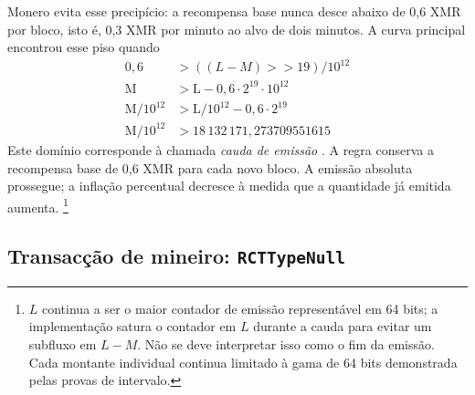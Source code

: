 Monero  evita esse precipício: a recompensa base nunca
desce abaixo de 0,6 XMR por bloco, isto é, 0,3 XMR por minuto ao alvo de dois
minutos. A curva principal encontrou esse piso quando
\begin{align*}
               0{,}6 &> ((L-M)\mathbin{>>}19)/10^{12} \\
        \textrm{M} &> \textrm{L} - 0{,}6\cdot2^{19}\cdot10^{12} \\
\textrm{M}/10^{12} &> \textrm{L}/10^{12} - 0{,}6\cdot2^{19} \\
\textrm{M}/10^{12} &> 18\,132\,171{,}273709551615
\end{align*}
%
Este domínio corresponde à chamada \emph{cauda de emissão}
\cite{monero-tail-emission}. A regra conserva a recompensa base de 0,6
XMR para cada novo bloco. A emissão absoluta prossegue; a inflação percentual
decresce à medida que a quantidade já emitida aumenta.
\footnote{$L$ continua a ser o maior contador de emissão representável em 64
bits; a implementação satura o contador em $L$ durante a cauda para evitar um
subfluxo em $L-M$. Não se deve interpretar isso como o fim da emissão. Cada
montante individual continua limitado à gama de 64 bits demonstrada pelas
provas de intervalo.}

\subsection{Transacção de mineiro: {\tt RCTTypeNull}}
\label{subsec:miner-transaction}

